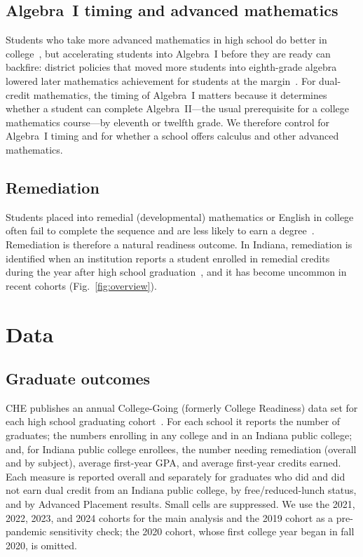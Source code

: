 \documentclass[aps,prd,reprint,superscriptaddress,nofootinbib,floatfix]{revtex4-2}
\begin{document}
\subsection{Algebra~I timing and advanced mathematics}

Students who take more advanced mathematics in high school do better in college~\cite{long2012}, but accelerating students into Algebra~I before they are ready can backfire: district policies that moved more students into eighth-grade algebra lowered later mathematics achievement for students at the margin~\cite{clotfelter2015,domina2015}. For dual-credit mathematics, the timing of Algebra~I matters because it determines whether a student can complete Algebra~II---the usual prerequisite for a college mathematics course---by eleventh or twelfth grade. We therefore control for Algebra~I timing and for whether a school offers calculus and other advanced mathematics.

\subsection{Remediation}

Students placed into remedial (developmental) mathematics or English in college often fail to complete the sequence and are less likely to earn a degree~\cite{bailey2010}. Remediation is therefore a natural readiness outcome. In Indiana, remediation is identified when an institution reports a student enrolled in remedial credits during the year after high school graduation~\cite{cheguide}, and it has become uncommon in recent cohorts (Fig.~\ref{fig:overview}).

\section{Data}\label{sec:data}

\subsection{Graduate outcomes}

CHE publishes an annual College-Going (formerly College Readiness) data set for each high school graduating cohort~\cite{chedata}. For each school it reports the number of graduates; the numbers enrolling in any college and in an Indiana public college; and, for Indiana public college enrollees, the number needing remediation (overall and by subject), average first-year GPA, and average first-year credits earned. Each measure is reported overall and separately for graduates who did and did not earn dual credit from an Indiana public college, by free/reduced-lunch status, and by Advanced Placement results. Small cells are suppressed. We use the 2021, 2022, 2023, and 2024 cohorts for the main analysis and the 2019 cohort as a pre-pandemic sensitivity check; the 2020 cohort, whose first college year began in fall 2020, is omitted.
\end{document}
